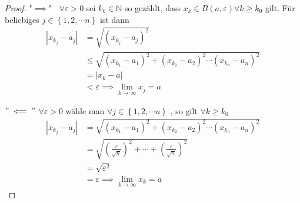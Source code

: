 \documentclass[11.5 pt, a4paper]{memoir}
\begin{document}
\begin{proof}
	"$ \implies $" $\;\; \forall \varepsilon >0  $ sei $ k_0 \in \mathbb{N} $ so gezählt, dass $ x_{k} \in B(a, \varepsilon) \forall k \geq k_0$
	gilt. Für beliebiges $ j \in \left\{ 1, 2, \cdots n \right\}  $ ist dann
	\begin{align*}
		\left| x_{k_{j}} - a_{j} \right| &= \sqrt{\left( x_{k_{j}} - a_{j} \right)^2}\\ 
		& \leq	\sqrt{ \left(  x_{k_{1}} - a _{1} \right)^2 +  \left(  x_{k_{2}} - a _{2}\right)^2 \cdots \left(  x_{k_{n}} - a _{n}\right)^2} \\ 
		& = \left| x_{k} -a \right| \\
		 & < \varepsilon \implies \lim_{ k \to \infty} x_{j} = a  
	\end{align*}
	
$"\impliedby"$ $ \forall \varepsilon > 0 $ wähle man $ \forall j \in \left\{  1,2, \cdots n \right\}$ , so gilt $ \forall k \geq k_0$
\begin{align*}
	 \left| x_{k_{j}} - a_{j} \right| &= \sqrt{ \left(  x_{k_{1}} - a _{1} \right)^2 +  \left(  x_{k_{2}} - a _{2}\right)^2 \cdots 
\left(  x_{k_{n}} - a _{n}\right)^2} \\
&= \sqrt{\left( \frac{ \varepsilon}{\sqrt{n}} \right)^2 + \cdots +  \left( \frac{ \varepsilon}{\sqrt{n}} \right)^2}\\
& = \sqrt{ \varepsilon^2}\\
&= \varepsilon \implies \lim_{k \to \infty} x_{k} = a  
\end{align*}

 
\end{proof}
	
\end{document}
